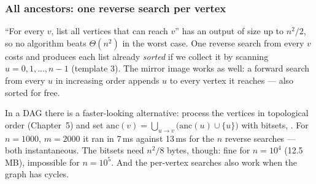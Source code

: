 \subsubsection*{All ancestors: one reverse search per vertex}

``For every $v$, list all vertices that can reach $v$'' has an output of size up to $n^2/2$, so no algorithm beats $\Theta(n^2)$ in the worst case. One reverse search from every $v$ costs  and produces each list already \emph{sorted} if we collect it by scanning $u = 0, 1, \dots, n-1$ (template 3). The mirror image works as well: a forward search from every $u$ in increasing order appends $u$ to every vertex it reaches --- also sorted for free.

\begin{diagrambox}
\end{diagrambox}

In a DAG there is a faster-looking alternative: process the vertices in topological order (Chapter~5) and set $\mathrm{anc}(v) = \bigcup_{u \to v} \big(\mathrm{anc}(u) \cup \{u\}\big)$ with bitsets, . For $n = 1000$, $m = 2000$ it ran in 7\,ms against 13\,ms for the $n$ reverse searches --- both instantaneous. The bitsets need $n^2/8$ bytes, though: fine for $n = 10^4$ (12.5\,MB), impossible for $n = 10^5$. And the per-vertex searches also work when the graph has cycles.

